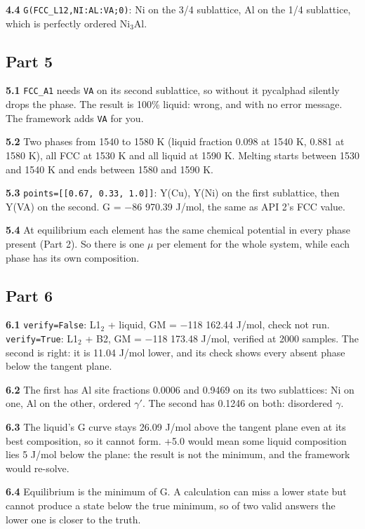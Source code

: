 \documentclass[12pt,a4paper]{article}
\begin{document}
\textbf{4.4} \texttt{G(FCC\_\allowbreak{}L12,\allowbreak{}NI:AL:VA;0)}: Ni on the 3/4 sublattice, Al on the 1/4 sublattice, which is perfectly ordered Ni\(_{3}\)Al.


\subsection*{Part 5}
\textbf{5.1} \texttt{FCC\_\allowbreak{}A1} needs \texttt{VA} on its second sublattice, so without it pycalphad silently drops the phase. The result is 100\% liquid: wrong, and with no error message. The framework adds \texttt{VA} for you.

\textbf{5.2} Two phases from 1540 to 1580 K (liquid fraction 0.098 at 1540 K, 0.881 at 1580 K), all FCC at 1530 K and all liquid at 1590 K. Melting starts between 1530 and 1540 K and ends between 1580 and 1590 K.

\textbf{5.3} \texttt{points=[[0.\allowbreak{}67,\allowbreak{} 0.\allowbreak{}33,\allowbreak{} 1.\allowbreak{}0]]}: Y(Cu), Y(Ni) on the first sublattice, then Y(VA) on the second. G = \(-\)86 970.39 J/mol, the same as API 2's FCC value.

\textbf{5.4} At equilibrium each element has the same chemical potential in every phase present (Part 2). So there is one \(\mu\) per element for the whole system, while each phase has its own composition.


\subsection*{Part 6}
\textbf{6.1} \texttt{verify=False}: L1\(_{2}\) + liquid, GM = \(-\)118 162.44 J/mol, check not run. \texttt{verify=True}: L1\(_{2}\) + B2, GM = \(-\)118 173.48 J/mol, verified at 2000 samples. The second is right: it is 11.04 J/mol lower, and its check shows every absent phase below the tangent plane.

\textbf{6.2} The first has Al site fractions 0.0006 and 0.9469 on its two sublattices: Ni on one, Al on the other, ordered \(\gamma '\). The second has 0.1246 on both: disordered \(\gamma\).

\textbf{6.3} The liquid's G curve stays 26.09 J/mol above the tangent plane even at its best composition, so it cannot form. +5.0 would mean some liquid composition lies 5 J/mol below the plane: the result is not the minimum, and the framework would re-solve.

\textbf{6.4} Equilibrium is the minimum of G. A calculation can miss a lower state but cannot produce a state below the true minimum, so of two valid answers the lower one is closer to the truth.
\end{document}
